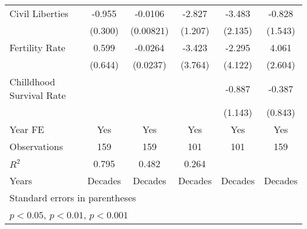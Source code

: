 \begin{table}[htbp]
\begin{tabular}{l*{5}{c}}
\addlinespace
Civil Liberties &   -0.955\sym{**} &  -0.0106         &   -2.827\sym{*}  &   -3.483         &   -0.828         \\
                &  (0.300)         &(0.00821)         &  (1.207)         &  (2.135)         &  (1.543)         \\
\addlinespace
Fertility Rate  &    0.599         &  -0.0264         &   -3.423         &   -2.295         &    4.061         \\
                &  (0.644)         & (0.0237)         &  (3.764)         &  (4.122)         &  (2.604)         \\
\addlinespace
Chilldhood Survival Rate&                  &                  &                  &   -0.887         &   -0.387         \\
                &                  &                  &                  &  (1.143)         &  (0.843)         \\
\addlinespace
Year FE         &      Yes         &      Yes         &      Yes         &      Yes         &      Yes         \\
\midrule
Observations    &      159         &      159         &      101         &      101         &      159         \\
\(R^{2}\)       &    0.795         &    0.482         &    0.264         &                  &                  \\
Years           &  Decades         &  Decades         &  Decades         &  Decades         &  Decades         \\
\bottomrule
\multicolumn{6}{l}{\footnotesize Standard errors in parentheses}\\
\multicolumn{6}{l}{\footnotesize \sym{*} \(p<0.05\), \sym{**} \(p<0.01\), \sym{***} \(p<0.001\)}\\
\end{tabular}
\end{table}
